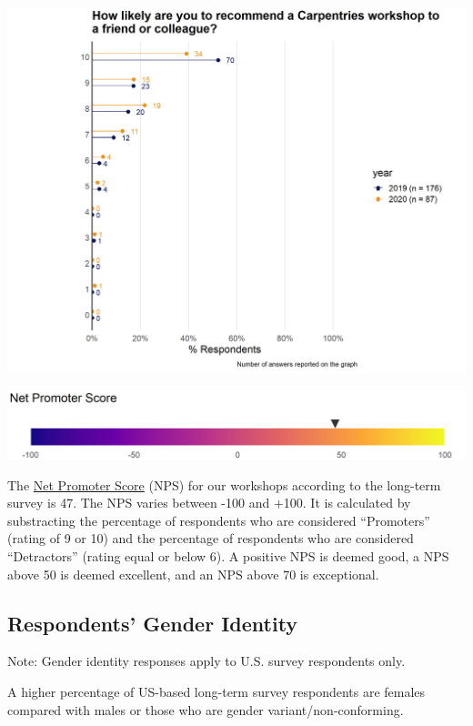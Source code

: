 \documentclass[
]{article}
\makeatletter
\def\maxwidth{\ifdim\Gin@nat@width>\linewidth\linewidth\else\Gin@nat@width\fi}
\makeatother
\begin{document}
\includegraphics[width=\maxwidth]{../figures/2020-12-longterm-recommendation_score-1}

\includegraphics[width=\maxwidth]{../figures/2020-12-longterm-nps-1}

The \href{https://en.wikipedia.org/wiki/Net_Promoter}{Net Promoter
Score} (NPS) for our workshops according to the long-term survey is 47.
The NPS varies between -100 and +100. It is calculated by substracting
the percentage of respondents who are considered ``Promoters'' (rating
of 9 or 10) and the percentage of respondents who are considered
``Detractors'' (rating equal or below 6). A positive NPS is deemed good,
a NPS above 50 is deemed excellent, and an NPS above 70 is exceptional.

\hypertarget{respondents-gender-identity}{%
\subsection{Respondents' Gender
Identity}\label{respondents-gender-identity}}

Note: Gender identity responses apply to U.S. survey respondents only.

A higher percentage of US-based long-term survey respondents are females
compared with males or those who are gender variant/non-conforming.
\end{document}
